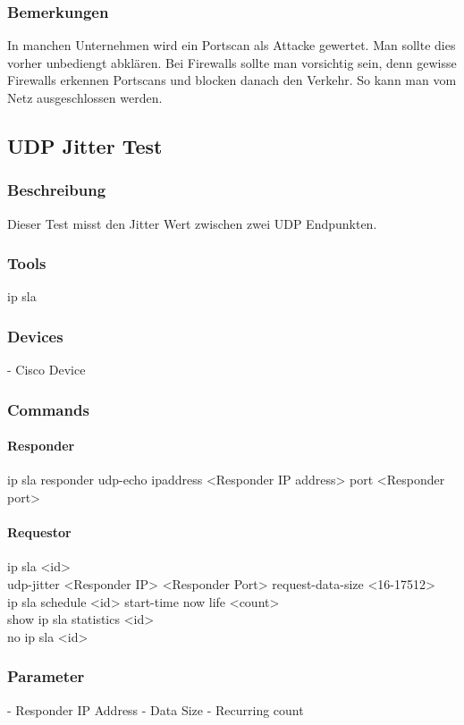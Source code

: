 \documentclass[a4,12pt]{scrartcl}
\begin{document}
\subsubsection{Bemerkungen}
In manchen Unternehmen wird ein Portscan als Attacke gewertet. Man sollte dies vorher unbediengt abklären.
Bei Firewalls sollte man vorsichtig sein, denn gewisse Firewalls erkennen Portscans und blocken danach den Verkehr. So kann man vom Netz ausgeschlossen werden.

\subsection{UDP Jitter Test}
\subsubsection{Beschreibung}
Dieser Test misst den Jitter Wert zwischen zwei UDP Endpunkten.
\subsubsection{Tools}
ip sla
\subsubsection{Devices}
- Cisco Device
\subsubsection{Commands}
\paragraph{Responder}\hfill

\noindent ip sla responder udp-echo ipaddress <Responder IP address> port <Responder port>\\

\paragraph{Requestor}\hfill

\noindent ip sla <id>\\
udp-jitter <Responder IP> <Responder Port>
request-data-size <16-17512>\\
ip sla schedule <id> start-time now life <count>\\
show ip sla statistics <id>\\
no ip sla <id>
\subsubsection{Parameter}
- Responder IP Address
- Data Size
- Recurring count
\end{document}
